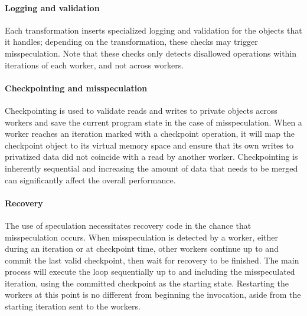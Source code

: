\paragraph{Logging and validation}
Each transformation inserts specialized logging and validation for the
objects that it handles; depending on the transformation, these checks may
trigger misspeculation. Note that these checks only detects disallowed
operations within iterations of each worker, and not across workers.

\paragraph{Checkpointing and misspeculation}
Checkpointing is used to validate reads and writes to private objects
across workers and save the current program state in
the case of misspeculation. When a worker reaches an iteration marked with
a checkpoint operation, it will map the checkpoint object to its virtual
memory space and ensure that its own writes to privatized data did not
coincide with a read by another worker. Checkpointing is inherently
sequential and increasing the amount of data that needs to be merged can
significantly affect the overall performance.

\paragraph{Recovery}
The use of speculation necessitates recovery code in the chance that
misspeculation occurs.
When misspeculation is detected by a worker, either during an
iteration or at checkpoint time, other workers continue up to and commit the last
valid checkpoint, then wait for recovery to be finished.
The main process will execute the loop
sequentially up to and including the misspeculated iteration, using the
committed checkpoint as the starting state. Restarting
the workers at this point is no different from beginning the invocation,
aside from the starting iteration sent to the workers.
